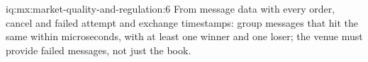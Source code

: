 \begin{solution}{iq:mx:market-quality-and-regulation:6}
From message data with every order, cancel and failed attempt and exchange timestamps: group messages that hit the same  within
microseconds, with at least one winner and one loser; the venue must provide failed messages, not just the book.
\end{solution}
